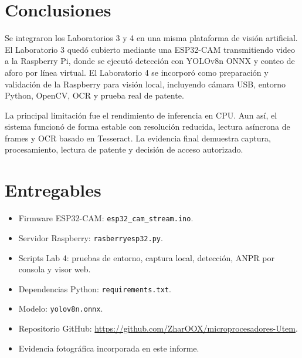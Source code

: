 \documentclass[12pt, letterpaper]{article}
\begin{document}
\section{Conclusiones}

Se integraron los Laboratorios 3 y 4 en una misma plataforma de visión artificial. El Laboratorio 3 quedó cubierto mediante una ESP32-CAM transmitiendo video a la Raspberry Pi, donde se ejecutó detección con YOLOv8n ONNX y conteo de aforo por línea virtual. El Laboratorio 4 se incorporó como preparación y validación de la Raspberry para visión local, incluyendo cámara USB, entorno Python, OpenCV, OCR y prueba real de patente.

La principal limitación fue el rendimiento de inferencia en CPU. Aun así, el sistema funcionó de forma estable con resolución reducida, lectura asíncrona de frames y OCR basado en Tesseract. La evidencia final demuestra captura, procesamiento, lectura de patente y decisión de acceso autorizado.

\section{Entregables}

\begin{itemize}
    \item Firmware ESP32-CAM: \texttt{esp32\_cam\_stream.ino}.
    \item Servidor Raspberry: \texttt{rasberryesp32.py}.
    \item Scripts Lab 4: pruebas de entorno, captura local, detección,
    ANPR por consola y visor web.
    \item Dependencias Python: \texttt{requirements.txt}.
    \item Modelo: \texttt{yolov8n.onnx}.
    \item Repositorio GitHub: \url{https://github.com/ZharOOX/microprocesadores-Utem}.
    \item Evidencia fotográfica incorporada en este informe.
\end{itemize}

\newpage
{}
\nocite{*}

\end{document}
